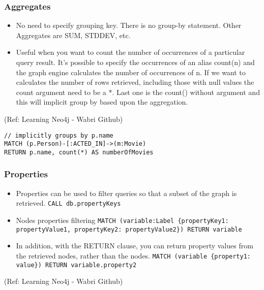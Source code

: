 \begin{frame}[fragile]\frametitle{Aggregates}

\begin{itemize}
\item No need to specify grouping key. There is no group-by statement. Other Aggregates are SUM, STDDEV, etc.
\item Useful when you want to count the number of occurrences of a particular query result. It's possible to specify the occurrences of an alias count(n) and the graph engine calculates the number of occurrences of n. If we want to calculates the number of rows retrieved, including those with null values the count argument need to be a *. Last one is the count() without argument and this will implicit group by based upon the aggregation.
\end{itemize}

{\tiny (Ref: Learning Neo4j - Wabri Github)}


\begin{lstlisting}
// implicitly groups by p.name
MATCH (p.Person)-[:ACTED_IN]->(m:Movie)
RETURN p.name, count(*) AS numberOfMovies
\end{lstlisting}	

\end{frame}

\begin{frame}\frametitle{Properties }

\begin{itemize}
\item Properties can be used to filter queries so that a subset of the graph is retrieved. \lstinline|CALL db.propertyKeys|
\item Nodes properties filtering \lstinline|MATCH (variable:Label {propertyKey1: propertyValue1, propertyKey2: propertyValue2}) RETURN variable|
\item In addition, with the RETURN clause, you can return property values from the retrieved nodes, rather than the nodes. \lstinline|MATCH (variable {property1: value}) RETURN variable.property2|
\end{itemize}


{\tiny (Ref: Learning Neo4j - Wabri Github)}
\end{frame}

